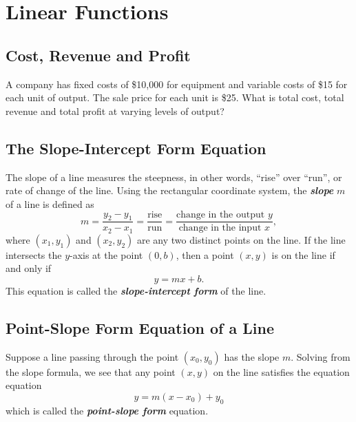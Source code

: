 \documentclass[
  en,11pt]{elegantbook}
\newcommand{\size}[2]{{\fontsize{#1}{0}\selectfont#2}}
\newenvironment{rmdthink}{
	\vspace*{0.5\baselineskip}
	\par\noindent
	\makebox[-4pt][r]{\color{green!90}\size{12}{\faLightbulbO}\,\,}
    \begin{tcolorbox}[
    enhanced,
    title={\textbf{\color{second}Think}},
    title style={left color=blue!10!green!20!white,right color=yellow!20!blue!20!white},
    colback=green!20!white,
    ]
    \sffamily
}{
    \end{tcolorbox}
	\par\ignorespacesafterend
}
\begin{document}
\hypertarget{linear-functions}{%
\chapter{Linear Functions}\label{linear-functions}}

\hypertarget{cost-revenue-and-profit}{%
\section{Cost, Revenue and Profit}\label{cost-revenue-and-profit}}

\begin{rmdthink}

A company has fixed costs of \$10,000 for equipment and variable costs of \$15 for each unit of output. The sale price for each unit is \$25. What is total cost, total revenue and total profit at varying levels of output?

\end{rmdthink}

\hypertarget{the-slope-intercept-form-equation}{%
\section{The Slope-Intercept Form Equation}\label{the-slope-intercept-form-equation}}

The slope of a line measures the steepness, in other words, ``rise'' over ``run'', or rate of change of the line. Using the rectangular coordinate system, the \textbf{\emph{slope}} \(m\) of a line is defined as
\[
m=\dfrac{y_2-y_1}{x_2-x_1}=\dfrac{\text{rise}}{\text{run}}=\dfrac{\text{change in the output }y}{\text{change in the input } x},
\]
where \((x_1, y_1)\) and \((x_2, y_2)\) are any two distinct points on the line. If the line intersects the \(y\)-axis at the point \((0, b)\), then a point \((x, y)\) is on the line if and only if
\[
y=mx+b.
\]
This equation is called the \textbf{\emph{slope-intercept form}} of the line.

\hypertarget{point-slope-form-equation-of-a-line}{%
\section{Point-Slope Form Equation of a Line}\label{point-slope-form-equation-of-a-line}}

Suppose a line passing through the point \((x_0, y_0)\) has the slope \(m\). Solving from the slope formula, we see that any point \((x, y)\) on the line satisfies the equation equation
\[
y=m(x-x_0)+y_0
\]
which is called the \textbf{\emph{point-slope form}} equation.
\end{document}
